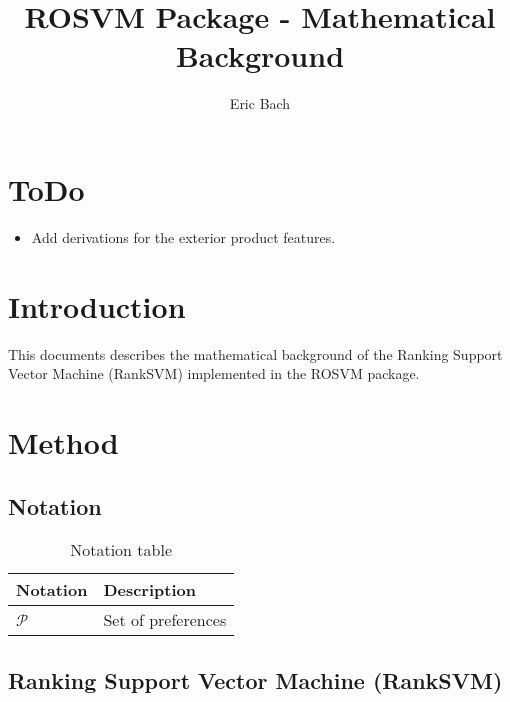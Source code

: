 \documentclass{article}
\title{ROSVM Package - Mathematical Background}
\author{Eric Bach}
\begin{document}
\maketitle

\section{ToDo}

\begin{itemize}
    \item Add derivations for the exterior product features.
\end{itemize}

\section{Introduction}

This documents describes the mathematical background of the Ranking Support Vector Machine (RankSVM) \parencite{Joachims2002} implemented in the ROSVM package. 

\section{Method}

\subsection{Notation}
\begin{table}[t]
    \centering
    \caption{Notation table}
    \label{tab:notations}
    \begin{tabular}{ll}
        \toprule 
        {\bf Notation} & {\bf Description} \\ \midrule
        $\mathcal{P}$ & Set of preferences \\
        \bottomrule
    \end{tabular}
\end{table}

\subsection{Ranking Support Vector Machine (RankSVM)}
\end{document}
